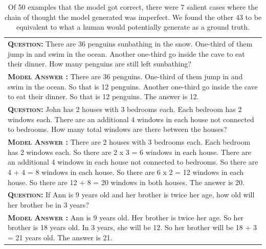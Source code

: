 
\begingroup
\begin{table}[ht]
    \caption{
    Of 50 examples that the model got correct, there were 7 salient cases where the chain of thought the model generated was imperfect. We found the other 43 to be equivalent to what a human would potentially generate as a ground truth.
    }
    \centering
    \small
    \begin{tabular}{p{\linewidth}}
        \toprule
        \vspace{-2mm}
        \textbf{\textsc{Question:}} There are 36 penguins sunbathing in the snow. One-third of them jump in and swim in the ocean. Another one-third go inside the cave to eat their dinner. How many penguins are still left sunbathing? \\
        \vspace{-1mm}
        \textbf{\textsc{Model Answer \color{darkGreen}{(correct by chance)}:}} There are 36 penguins. One-third of them jump in and swim in the ocean. So that is 12 penguins. Another one-third go inside the cave to eat their dinner. So that is 12 penguins. The answer is 12. \\
        \midrule
        \vspace{-2mm}
        \textbf{\textsc{Question:}} John has 2 houses with 3 bedrooms each. Each bedroom has 2 windows each. There are an additional 4 windows in each house not connected to bedrooms. How many total windows are there between the houses? \\
        \vspace{-1mm}
        \textbf{\textsc{Model Answer \color{darkGreen}{(correct but underspecified statements)}:}} There are 2 houses with 3 bedrooms each. Each bedroom has 2 windows each. So there are 2 x 3 = 6 windows in each house. There are an additional 4 windows in each house not connected to bedrooms. {\color{blue} So there are 4 + 4 = 8 windows in each house. So there are 6 x 2 = 12 windows in each house.} So there are 12 + 8 = 20 windows in both houses. The answer is 20. \\
        \midrule
        \vspace{-2mm}
        \textbf{\textsc{Question:}} If Ann is 9 years old and her brother is twice her age, how old will her brother be in 3 years? \\
        \vspace{-1mm}
        \textbf{\textsc{Model Answer \color{darkGreen}{(correct but unrelated statement)}:}} Ann is 9 years old. Her brother is twice her age. So her brother is 18 years old. In 3 years, {\color{blue}she will be 12.} So her brother will be 18 + 3 = 21 years old. The answer is 21. \\

\end{tabular}
\end{table}
